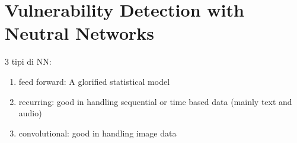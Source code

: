 \documentclass{article}
\begin{document}
\section{Vulnerability Detection with Neutral Networks}
3 tipi di NN: \begin{enumerate}
    \item feed forward: A glorified statistical model
    \item recurring: good in handling sequential or time based data (mainly text and audio)
    \item convolutional: good in handling image data
\end{enumerate}
\end{document}
